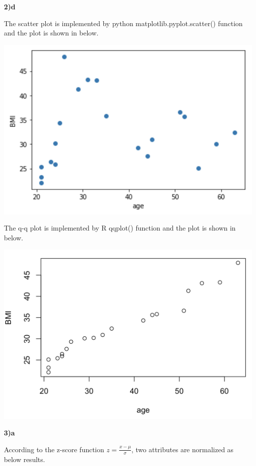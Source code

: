 \documentclass{article}
\begin{document}
\bigskip

\textbf{2)d}

The scatter plot is implemented by python matplotlib.pyplot.scatter() function and the plot is shown in below.

\includegraphics[scale=0.5]{scatter_plot.png}

The q-q plot is implemented by R qqplot() function and the plot is shown in below.

\includegraphics[scale=0.5]{qqplot.png}

\bigskip

\textbf{3)a}

According to the z-score function $z=\frac{x-\mu}{\sigma}$, two attributes are normalized as below results.
\end{document}
